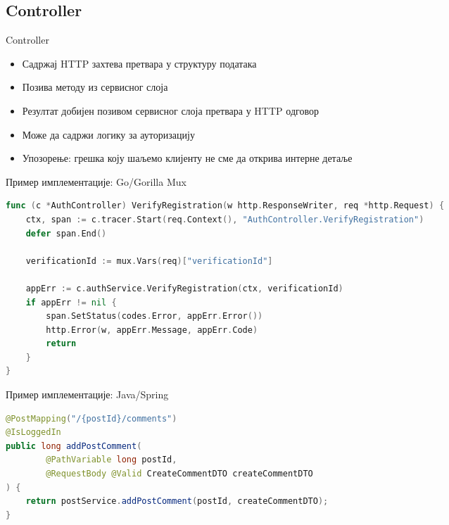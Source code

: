 \documentclass{beamer}
\begin{document}
    \subsection{Controller}
    
    \begin{frame}{Controller}
        \begin{itemize}
            \item Садржај HTTP захтева претвара у структуру података
            \item Позива методу из сервисног слоја
            \item Резултат добијен позивом сервисног слоја претвара у HTTP одговор
            \item Може да садржи логику за ауторизацију
            \item Упозорење: грешка коју шаљемо клијенту не сме да открива интерне детаље
        \end{itemize}
    \end{frame}
    
    \begin{frame}[fragile]{Пример имплементације: Go/Gorilla Mux}
        \begin{adjustbox}{width=\textwidth,height=\textheight,keepaspectratio}
            \begin{lstlisting}[language=go]
func (c *AuthController) VerifyRegistration(w http.ResponseWriter, req *http.Request) {
    ctx, span := c.tracer.Start(req.Context(), "AuthController.VerifyRegistration")
    defer span.End()

    verificationId := mux.Vars(req)["verificationId"]

    appErr := c.authService.VerifyRegistration(ctx, verificationId)
    if appErr != nil {
        span.SetStatus(codes.Error, appErr.Error())
        http.Error(w, appErr.Message, appErr.Code)
        return
    }
}
            \end{lstlisting}
        \end{adjustbox}
    \end{frame}
    
    \begin{frame}[fragile]{Пример имплементације: Java/Spring}
        \begin{adjustbox}{width=\textwidth,height=\textheight,keepaspectratio}
            \begin{lstlisting}[language=java]
@PostMapping("/{postId}/comments")
@IsLoggedIn
public long addPostComment(
        @PathVariable long postId,
        @RequestBody @Valid CreateCommentDTO createCommentDTO
) {
    return postService.addPostComment(postId, createCommentDTO);
}

            \end{lstlisting}
        \end{adjustbox}
    \end{frame}
    
\end{document}
